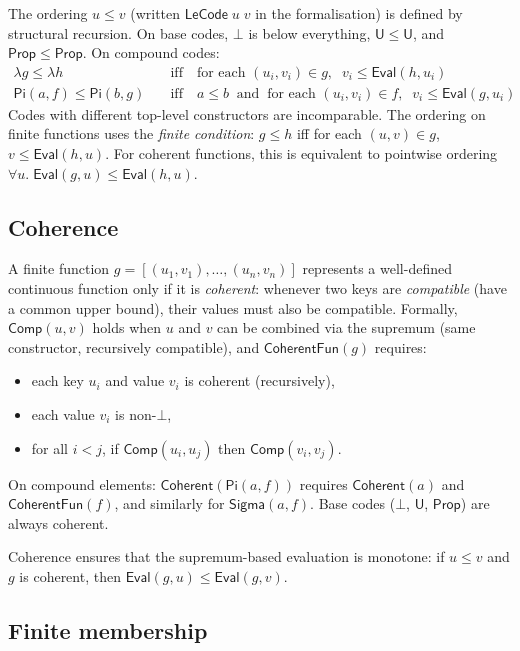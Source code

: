 \documentclass[11pt]{article}
\newcommand{\U}{\mathsf{U}}
\newcommand{\Prop}{\mathsf{Prop}}
\newcommand{\PiC}[2]{\mathsf{Pi}(#1,#2)}
\newcommand{\SigmaC}[2]{\mathsf{Sigma}(#1,#2)}
\newcommand{\EvalFun}{\mathsf{Eval}}
\newcommand{\Bot}{\bot}
\begin{document}
The ordering $u \leq v$ (written $\mathsf{LeCode}\;u\;v$ in the formalisation)
is defined by structural recursion.  On base codes, $\Bot$ is below everything,
$\U \leq \U$, and $\Prop \leq \Prop$.
On compound codes:
\begin{align*}
  \lambda g \leq \lambda h
  &\quad\text{iff}\quad
  \text{for each } (u_i,v_i) \in g,\;\; v_i \leq \EvalFun(h, u_i) \\
  \PiC{a}{f} \leq \PiC{b}{g}
  &\quad\text{iff}\quad
  a \leq b \;\;\text{and}\;\;
  \text{for each } (u_i,v_i) \in f,\;\; v_i \leq \EvalFun(g, u_i)
\end{align*}
Codes with different top-level constructors are incomparable.
The ordering on finite functions uses the \emph{finite condition}:
$g \leq h$ iff for each $(u,v) \in g$, $v \leq \EvalFun(h, u)$.
For coherent functions, this is equivalent to pointwise ordering
$\forall u.\; \EvalFun(g,u) \leq \EvalFun(h,u)$.

\subsection{Coherence}

A finite function $g = [(u_1,v_1), \ldots, (u_n,v_n)]$ represents a
well-defined continuous function only if it is \emph{coherent}: whenever
two keys are \emph{compatible} (have a common upper bound), their values
must also be compatible.  Formally, $\mathsf{Comp}(u,v)$ holds when $u$
and $v$ can be combined via the supremum (same constructor, recursively
compatible), and $\mathsf{CoherentFun}(g)$ requires:
\begin{itemize}
\item each key $u_i$ and value $v_i$ is coherent (recursively),
\item each value $v_i$ is non-$\Bot$,
\item for all $i < j$, if $\mathsf{Comp}(u_i, u_j)$ then
  $\mathsf{Comp}(v_i, v_j)$.
\end{itemize}
On compound elements: $\mathsf{Coherent}(\PiC{a}{f})$ requires
$\mathsf{Coherent}(a)$ and $\mathsf{CoherentFun}(f)$, and similarly for
$\SigmaC{a}{f}$.  Base codes ($\Bot$, $\U$, $\Prop$) are always coherent.

Coherence ensures that the supremum-based evaluation is monotone: if
$u \leq v$ and $g$ is coherent, then $\EvalFun(g, u) \leq \EvalFun(g, v)$.

\subsection{Finite membership}
\end{document}
